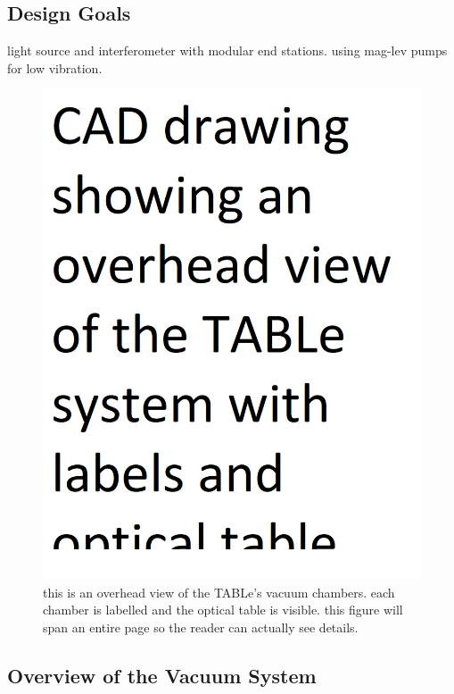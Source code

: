 \subsection{Design Goals}

light source and interferometer with modular end stations. using mag-lev pumps for low vibration.


\begin{figure}
	\centering
	\includegraphics[width=1.0\textwidth]{figures/chap2/TABLe_CAD_drawing.png}
	\caption{this is an overhead view of the TABLe's vacuum chambers. each chamber is labelled and the optical table is visible. this figure will span an entire page so the reader can actually see details.}
	\label{fig:AirAbs}
\end{figure}


\subsection{Overview of the Vacuum System}

